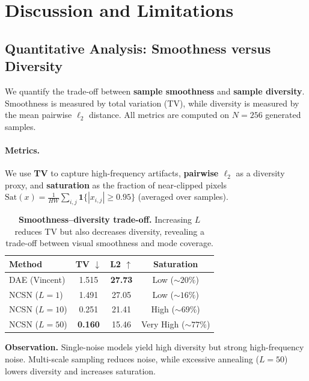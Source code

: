 \documentclass[11pt,a4paper]{article}
\begin{document}
\section{Discussion and Limitations}

\subsection{Quantitative Analysis: Smoothness versus Diversity}

We quantify the trade-off between \textbf{sample smoothness} and \textbf{sample diversity}.
Smoothness is measured by total variation (TV), while diversity is measured by the mean pairwise $\ell_2$ distance.
All metrics are computed on $N=256$ generated samples.

\paragraph{Metrics.}
We use \textbf{TV} to capture high-frequency artifacts, \textbf{pairwise $\ell_2$} as a diversity proxy, and
\textbf{saturation} as the fraction of near-clipped pixels
$\mathrm{Sat}(x)=\frac{1}{HW}\sum_{i,j}\mathbf{1}\{|x_{i,j}|\ge 0.95\}$ (averaged over samples).

\begin{table}[H]
    \centering
    \small
    \renewcommand{\arraystretch}{1.2}
    \begin{tabular}{@{}lccc@{}}
    \toprule
    \textbf{Method} & \textbf{TV} $\downarrow$ & \textbf{L2} $\uparrow$ & \textbf{Saturation} \\
    \midrule
    DAE (Vincent) & 1.515 & \textbf{27.73} & Low ($\sim 20\%$) \\
    NCSN ($L=1$) & 1.491 & 27.05 & Low ($\sim 16\%$) \\
    NCSN ($L=10$) & 0.251 & 21.41 & High ($\sim 69\%$) \\
    NCSN ($L=50$) & \textbf{0.160} & 15.46 & Very High ($\sim 77\%$) \\
    \bottomrule
    \end{tabular}
    \caption{\textbf{Smoothness--diversity trade-off.}
    Increasing $L$ reduces TV but also decreases diversity, revealing a trade-off between visual smoothness and mode coverage.}
    \label{tab:tradeoff}
\end{table}

\textbf{Observation.}
Single-noise models yield high diversity but strong high-frequency noise.
Multi-scale sampling reduces noise, while excessive annealing ($L=50$) lowers diversity and increases saturation.
\end{document}
